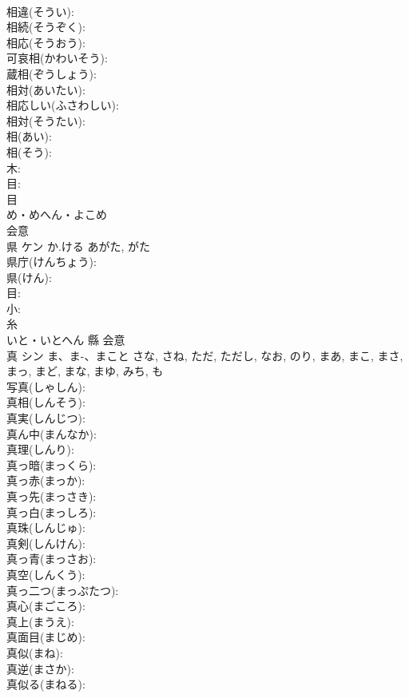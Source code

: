 \documentclass[8pt]{extreport}
\begin{document}
\begin{CJK}{UTF8}{min}
\\	相違(そうい): 
\\	相続(そうぞく): 
\\	相応(そうおう): 
\\	可哀相(かわいそう): 
\\	蔵相(ぞうしょう): 
\\	相対(あいたい): 
\\	相応しい(ふさわしい): 
\\	相対(そうたい): 
\\	相(あい): 
\\	相(そう): 
\\	木: 
\\	目: 
\\	目	
\\	め・めへん・よこめ	
\\	会意 
\\	県	ケン	か.ける	あがた, がた	
\\	県庁(けんちょう): 
\\	県(けん): 
\\	目: 
\\	小: 
\\	糸	
\\	いと・いとへん	縣	会意 
\\	真	シン	ま、ま-、まこと	さな, さね, ただ, ただし, なお, のり, まあ, まこ, まさ, まっ, まど, まな, まゆ, みち, も	
\\	写真(しゃしん): 
\\	真相(しんそう): 
\\	真実(しんじつ): 
\\	真ん中(まんなか): 
\\	真理(しんり): 
\\	真っ暗(まっくら): 
\\	真っ赤(まっか): 
\\	真っ先(まっさき): 
\\	真っ白(まっしろ): 
\\	真珠(しんじゅ): 
\\	真剣(しんけん): 
\\	真っ青(まっさお): 
\\	真空(しんくう): 
\\	真っ二つ(まっぷたつ): 
\\	真心(まごころ): 
\\	真上(まうえ): 
\\	真面目(まじめ): 
\\	真似(まね): 
\\	真逆(まさか): 
\\	真似る(まねる): 

\end{CJK}
\end{document}
